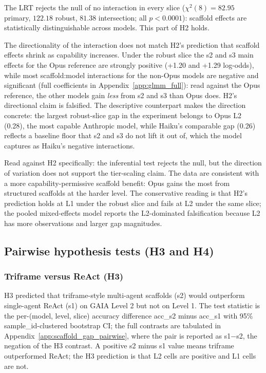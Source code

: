 \documentclass[10pt]{article} %
\begin{document}
            The LRT rejects the null of no interaction in every slice ($\chi^2(8) = 82.95$ primary, $122.18$ robust, $81.38$ intersection; all $p < 0.0001$): scaffold effects are statistically distinguishable across models. This part of H2 holds.
            
            The directionality of the interaction does not match H2's prediction that scaffold effects shrink as capability increases. Under the robust slice the s2 and s3 main effects for the Opus reference are strongly positive (+1.20 and +1.29 log-odds), while most scaffold:model interactions for the non-Opus models are negative and significant (full coefficients in Appendix~\ref{app:glmm_full}): read against the Opus reference, the other models gain \emph{less} from s2 and s3 than Opus does. H2's directional claim is falsified. The descriptive counterpart makes the direction concrete: the largest robust-slice gap in the experiment belongs to Opus L2 (0.28), the most capable Anthropic model, while Haiku's comparable gap (0.26) reflects a baseline floor that s2 and s3 do not lift it out of, which the model captures as Haiku's negative interactions.
            
            Read against H2 specifically: the inferential test rejects the null, but the direction of variation does not support the tier-scaling claim. The data are consistent with a more capability-permissive scaffold benefit: Opus gains the most from structured scaffolds at the harder level. The conservative reading is that H2's prediction holds at L1 under the robust slice and fails at L2 under the same slice; the pooled mixed-effects model reports the L2-dominated falsification because L2 has more observations and larger gap magnitudes.

    \subsection{Pairwise hypothesis tests (H3 and H4)}\label{sec:pairwise_hypotheses}

        \subsubsection{Triframe versus ReAct (H3)}
            
            H3 predicted that triframe-style multi-agent scaffolds (s2) would outperform single-agent ReAct (s1) on GAIA Level 2 but not on Level 1. The test statistic is the per-(model, level, slice) accuracy difference acc\_s2 minus acc\_s1 with 95\% sample\_id-clustered bootstrap CI; the full contrasts are tabulated in Appendix~\ref{app:scaffold_gap_pairwise}, where the pair is reported as s1$-$s2, the negation of the H3 contrast. A positive s2 minus s1 value means triframe outperformed ReAct; the H3 prediction is that L2 cells are positive and L1 cells are not.
        
\end{document}
